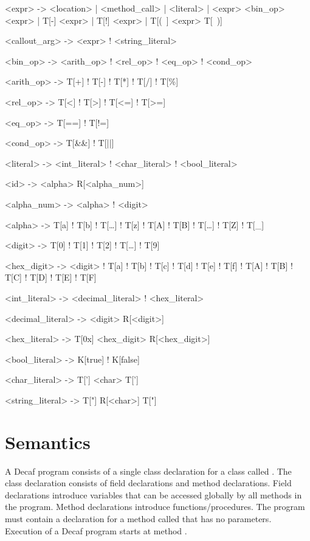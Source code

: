 \begin{bnfgrammar}
<expr> -> <location>
        | <method_call>
        | <literal>
        | <expr> <bin_op> <expr>
        | T[-] <expr>
        | T[!] <expr>
        | T[(~] <expr> T[~)]

<callout_arg> -> <expr> ! <string_literal>

<bin_op> -> <arith_op> ! <rel_op> ! <eq_op> ! <cond_op>

<arith_op> -> T[+] ! T[-] ! T[*] ! T[/] ! T[\%] %

<rel_op> -> T[<] ! T[>] ! T[<=] ! T[>=]

<eq_op>   -> T[==] ! T[!=]

<cond_op> -> T[\&\&] ! T[||]

<literal> -> <int_literal> ! <char_literal> ! <bool_literal>

<id> -> <alpha> R[<alpha_num>]

<alpha_num> -> <alpha> ! <digit>

<alpha> -> T[a] ! T[b] ! T[\ldots{}] ! T[z] ! T[A] ! T[B] ! T[\ldots{}] ! T[Z] ! T[\_]

<digit> -> T[0] ! T[1] ! T[2] ! T[\ldots] ! T[9]

<hex_digit> -> <digit> ! T[a] ! T[b] ! T[c] ! T[d] ! T[e] ! T[f] ! T[A] ! T[B] ! T[C] ! T[D] ! T[E] ! T[F]

<int_literal> -> <decimal_literal> ! <hex_literal>

<decimal_literal> -> <digit> R[<digit>]

<hex_literal> -> T[0x] <hex_digit> R[<hex_digit>]

<bool_literal> -> K[true] ! K[false]

<char_literal> -> T['] <char> T[']

<string_literal> -> T["] R[<char>] T["]
\end{bnfgrammar}

\section*{Semantics}
\def\arrayint{\kw{array}\term{\[\kw{int}\]}}
\def\arraybool{\kw{array}\term{\[\kw{bool}\]}}
\def\arrayT{\kw{array}\term{\[T\]}}

A Decaf program consists of a single class declaration
for a class called . The class declaration consists of
field declarations and method declarations.  Field declarations
introduce variables that can be accessed globally by all methods in
the program.  Method declarations introduce functions/procedures.  The
program must contain a declaration for a method called  that
has no parameters.  Execution of a Decaf program starts
at method .

